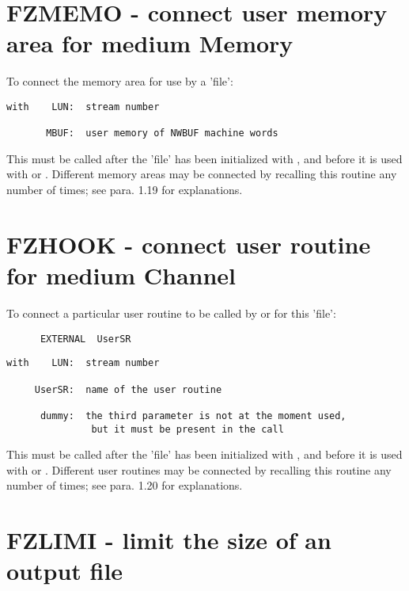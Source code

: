 \section{FZMEMO - connect user memory area for medium Memory}

To connect the memory area for use by a 'file':

\begin{verbatim}
with    LUN:  stream number

       MBUF:  user memory of NWBUF machine words
\end{verbatim}
This must be called after the 'file' has been initialized
with , and before it is used with  or .
Different memory areas may be connected by recalling this
routine any number of times;
see para. 1.19 for explanations.

\section{FZHOOK - connect user routine for medium Channel}

To connect a particular user routine to be called
by  or  for this 'file':
\begin{verbatim}
      EXTERNAL  UserSR
\end{verbatim}
\spcomp
\begin{verbatim}
with    LUN:  stream number

     UserSR:  name of the user routine

      dummy:  the third parameter is not at the moment used,
               but it must be present in the call
\end{verbatim}
\spnorm
This must be called after the 'file' has been initialized
with , and before it is used with  or .
Different user routines may be connected by recalling this
routine any number of times;
see para. 1.20 for explanations.

\section{FZLIMI - limit the size of an output file}


